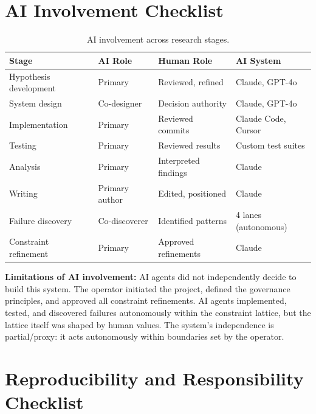 \documentclass[11pt,letterpaper]{article}
\begin{document}
\appendix

\section{AI Involvement Checklist}

\begin{table}[h]
\centering
\caption{AI involvement across research stages.}
\label{tab:ai-involvement}
\begin{tabular}{llll}
\toprule
\textbf{Stage} & \textbf{AI Role} & \textbf{Human Role} & \textbf{AI System} \\
\midrule
Hypothesis development & Primary & Reviewed, refined & Claude, GPT-4o \\
System design & Co-designer & Decision authority & Claude, GPT-4o \\
Implementation & Primary & Reviewed commits & Claude Code, Cursor \\
Testing & Primary & Reviewed results & Custom test suites \\
Analysis & Primary & Interpreted findings & Claude \\
Writing & Primary author & Edited, positioned & Claude \\
Failure discovery & Co-discoverer & Identified patterns & 4 lanes (autonomous) \\
Constraint refinement & Primary & Approved refinements & Claude \\
\bottomrule
\end{tabular}
\end{table}

\textbf{Limitations of AI involvement:} AI agents did not independently decide to build this system. The operator initiated the project, defined the governance principles, and approved all constraint refinements. AI agents implemented, tested, and discovered failures autonomously within the constraint lattice, but the lattice itself was shaped by human values. The system's independence is partial/proxy: it acts autonomously within boundaries set by the operator.

\section{Reproducibility and Responsibility Checklist}
\end{document}
